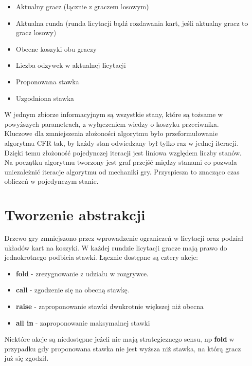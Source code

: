 \documentclass[licencjacka]{pracamgr}
\begin{document}
\begin{itemize}
\item Aktualny gracz (łącznie z graczem losowym)
\item Aktualna runda (runda licytacji bądź rozdawania kart, jeśli aktualny gracz to gracz losowy)
\item Obecne koszyki obu graczy
\item Liczba odzywek w aktualnej licytacji
\item Proponowana stawka
\item Uzgodniona stawka
\end{itemize}

\noindent
W jednym zbiorze informacyjnym są wszystkie stany, które są tożsame w powyższych parametrach, z wyłączeniem
wiedzy o koszyku przeciwnika. \\

\noindent
Kluczowe dla zmniejszenia złożoności algorytmu było przeformułowanie algorytmu CFR tak, by każdy
stan odwiedzany był tylko raz w jednej iteracji. Dzięki temu złożoność pojedynczej iteracji jest
liniowa względem liczby stanów. Na początku algorytmu tworzony jest graf przejść między
stanami co pozwala uniezależnić iteracje algorytmu od mechaniki gry. Przyspiesza to znacząco
czas obliczeń w pojedynczym stanie.

\section{Tworzenie abstrakcji}

Drzewo gry zmniejszono przez wprowadzenie ograniczeń w licytacji oraz podział układów kart na koszyki.
W każdej rundzie licytacji gracze mają prawo do jednokrotnego podbicia stawki. Łącznie dostępne są cztery akcje:

\begin{itemize}
\item \textbf{fold} - zrezygnowanie z udziału w rozgrywce.
\item \textbf{call} - zgodzenie się na obecną stawkę.
\item \textbf{raise} - zaproponowanie stawki dwukrotnie większej niż obecna
\item \textbf{all in} - zaproponowanie maksymalnej stawki
\end{itemize}

\noindent
Niektóre akcje są niedostępne jeżeli nie mają strategicznego sensu, np \textbf{fold} w przypadku gdy
proponowana stawka nie jest wyższa niż stawka, na którą gracz już się zgodził. \\
\end{document}
